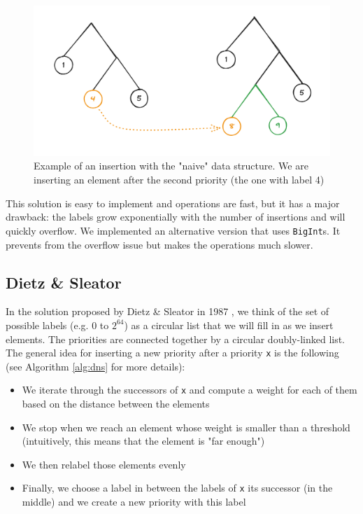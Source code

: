 \documentclass[12pt]{article}
\begin{document}
\begin{figure}[h!]
  \includegraphics[width=450px, keepaspectratio]{./naive-ex.png}
  \caption{Example of an insertion with the "naive" data structure. We are inserting an element after the second priority (the one with label 4)}
  \label{naive}
\end{figure}


This solution is easy to implement and operations are fast, but it has a major drawback: the labels grow exponentially with the number of insertions and will quickly overflow.
We implemented an alternative version that uses \texttt{BigInt}s. It prevents from the overflow issue but makes the operations much slower.

\subsection{Dietz \& Sleator}

In the solution proposed by Dietz \& Sleator in 1987 \cite{10.1145/28395.28434}, we think of the set of possible labels (e.g. $0$ to $2^{64}$) as a circular list that we will fill in as we insert elements.
The priorities are connected together by a circular doubly-linked list.
The general idea for inserting a new priority after a priority \texttt{x} is the following (see Algorithm \ref{alg:dns} for more details):
\begin{itemize}
  \item We iterate through the successors of \texttt{x} and compute a weight for each of them based on the distance between the elements
  \item We stop when we reach an element whose weight is smaller than a threshold (intuitively, this means that the element is "far enough")
  \item We then relabel those elements evenly
  \item Finally, we choose a label in between the labels of \texttt{x} its successor (in the middle) and we create a new priority with this label
\end{itemize}
\end{document}
